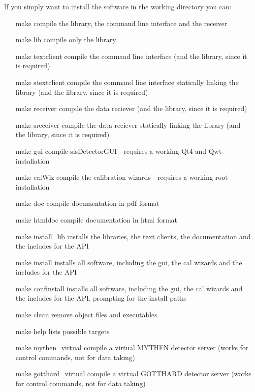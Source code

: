\documentclass{article}
\begin{document}
If you simply want to install the software in the working directory you can:
\begin{itemize}
\item[make] compile the library, the command line interface and the receiver 

\item[make lib]  compile only the library 

\item[make textclient] compile the command line interface (and the library, since it is required)

\item[make stextclient] compile the command line interface statically linking the library (and the library, since it is required)

\item[make receiver] compile the data reciever (and the library, since it is required)

\item[make sreceiver] compile the data reciever statically linking the library (and the library, since it is required)

\item[make gui]  compile slsDetectorGUI - requires a working Qt4 and Qwt installation

\item[make calWiz] compile the calibration wizards - requires a working root installation

\item[make doc] compile documentation in pdf format

\item[make htmldoc] compile documentation in html format

\item[make install\_lib]        installs the libraries, the text clients, the documentation and the includes for the API

\item[make install]            installs all software, including the gui, the cal wizards and the includes for the API

\item[make confinstall]         installs all software, including the gui, the cal wizards and the includes for the API, prompting for the install paths

\item[make clean]              remove object files and executables

\item[make help]               lists possible targets

\item[make mythen\_virtual]     compile a virtual MYTHEN detector server (works for control commands, not for data taking)

\item[make gotthard\_virtual]     compile a virtual GOTTHARD detector server (works for control commands, not for data taking)
\end{itemize}
\end{document}
